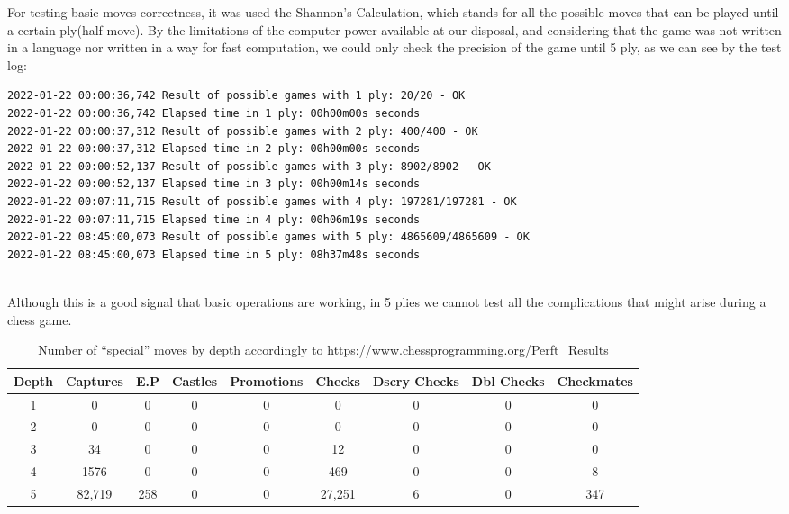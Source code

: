 \documentclass[10pt]{article}
\begin{document}
For testing basic moves correctness, it was used the Shannon's Calculation,
which stands for all the possible moves that can be played until a certain
ply(half-move). By the limitations of the computer power available at our
disposal, and considering that the game was not written in a language nor
written in a way for fast computation, we could only check the precision of the
game until 5 ply, as we can see by the test log:
\begin{lstlisting}
2022-01-22 00:00:36,742 Result of possible games with 1 ply: 20/20 - OK
2022-01-22 00:00:36,742 Elapsed time in 1 ply: 00h00m00s seconds
2022-01-22 00:00:37,312 Result of possible games with 2 ply: 400/400 - OK
2022-01-22 00:00:37,312 Elapsed time in 2 ply: 00h00m00s seconds
2022-01-22 00:00:52,137 Result of possible games with 3 ply: 8902/8902 - OK
2022-01-22 00:00:52,137 Elapsed time in 3 ply: 00h00m14s seconds
2022-01-22 00:07:11,715 Result of possible games with 4 ply: 197281/197281 - OK
2022-01-22 00:07:11,715 Elapsed time in 4 ply: 00h06m19s seconds
2022-01-22 08:45:00,073 Result of possible games with 5 ply: 4865609/4865609 - OK
2022-01-22 08:45:00,073 Elapsed time in 5 ply: 08h37m48s seconds
    
\end{lstlisting}

Although this is a good signal that basic operations are working, in 5 plies we
cannot test all the complications that might arise during a chess game.

\begin{table}[H]
\center
\begin{tabular}{|c|c|c|c|c|c|c|c|c|}
\hline
\textbf{Depth}   & \textbf{Captures} & \textbf{E.P} &
\textbf{Castles} & \textbf{Promotions} & \textbf{Checks} & \textbf{Dscry
Checks} & \textbf{Dbl Checks} & \textbf{Checkmates} \\
\hline
   1  & 0 & 0 & 0 & 0 & 0 & 0 & 0 & 0 \\
\hline
   2  & 0 & 0 & 0 & 0 & 0 & 0 & 0 & 0 \\
\hline
   3  & 34 & 0 & 0 & 0 & 12 & 0 & 0 & 0 \\
\hline
   4  & 1576 & 0 & 0 & 0 & 469 & 0 & 0 & 8 \\
\hline
5  & 82,719 & 258 & 0 & 0 & 27,251 & 6 & 0 & 347 \\
\hline
\end{tabular}
\caption{Number of ``special'' moves by depth accordingly to
\url{https://www.chessprogramming.org/Perft_Results} }
\end{table}
\end{document}
